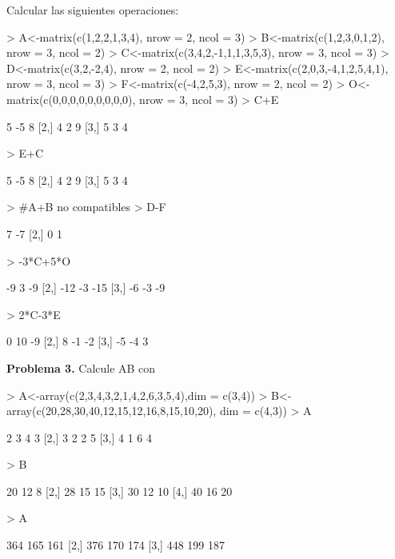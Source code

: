 \documentclass{article}
\begin{document}
Calcular las siguientes operaciones:
\begin{Schunk}
\begin{Sinput}
> A<-matrix(c(1,2,2,1,3,4), nrow = 2, ncol = 3)
> B<-matrix(c(1,2,3,0,1,2), nrow = 3, ncol = 2)
> C<-matrix(c(3,4,2,-1,1,1,3,5,3), nrow = 3, ncol = 3)
> D<-matrix(c(3,2,-2,4), nrow = 2, ncol = 2)
> E<-matrix(c(2,0,3,-4,1,2,5,4,1), nrow = 3, ncol = 3)
> F<-matrix(c(-4,2,5,3), nrow = 2, ncol = 2)
> O<-matrix(c(0,0,0,0,0,0,0,0,0), nrow = 3, ncol = 3)
> C+E
\end{Sinput}
\begin{Soutput}
     [,1] [,2] [,3]
[1,]    5   -5    8
[2,]    4    2    9
[3,]    5    3    4
\end{Soutput}
\begin{Sinput}
> E+C
\end{Sinput}
\begin{Soutput}
     [,1] [,2] [,3]
[1,]    5   -5    8
[2,]    4    2    9
[3,]    5    3    4
\end{Soutput}
\begin{Sinput}
> #A+B no compatibles
> D-F
\end{Sinput}
\begin{Soutput}
     [,1] [,2]
[1,]    7   -7
[2,]    0    1
\end{Soutput}
\begin{Sinput}
> -3*C+5*O
\end{Sinput}
\begin{Soutput}
     [,1] [,2] [,3]
[1,]   -9    3   -9
[2,]  -12   -3  -15
[3,]   -6   -3   -9
\end{Soutput}
\begin{Sinput}
> 2*C-3*E
\end{Sinput}
\begin{Soutput}
     [,1] [,2] [,3]
[1,]    0   10   -9
[2,]    8   -1   -2
[3,]   -5   -4    3
\end{Soutput}
\end{Schunk}
\textbf{Problema 3.}
Calcule AB con
\begin{Schunk}
\begin{Sinput}
> A<-array(c(2,3,4,3,2,1,4,2,6,3,5,4),dim = c(3,4))
> B<-array(c(20,28,30,40,12,15,12,16,8,15,10,20), dim = c(4,3))
> A
\end{Sinput}
\begin{Soutput}
     [,1] [,2] [,3] [,4]
[1,]    2    3    4    3
[2,]    3    2    2    5
[3,]    4    1    6    4
\end{Soutput}
\begin{Sinput}
> B
\end{Sinput}
\begin{Soutput}
     [,1] [,2] [,3]
[1,]   20   12    8
[2,]   28   15   15
[3,]   30   12   10
[4,]   40   16   20
\end{Soutput}
\begin{Sinput}
> A%*%B
\end{Sinput}
\begin{Soutput}
     [,1] [,2] [,3]
[1,]  364  165  161
[2,]  376  170  174
[3,]  448  199  187
\end{Soutput}
\end{Schunk}
\end{document}
